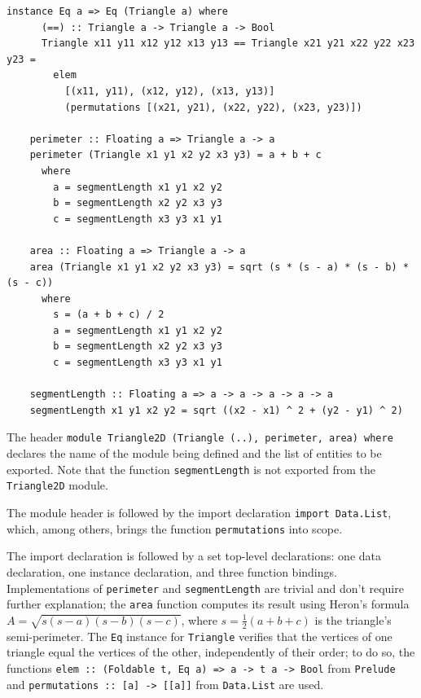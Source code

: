 \documentclass[UdineBachThesis,american,11pt]{PhdThesis}
\begin{document}
  \begin{Verbatim}[gobble=4,fontsize=\small]
    instance Eq a => Eq (Triangle a) where
      (==) :: Triangle a -> Triangle a -> Bool
      Triangle x11 y11 x12 y12 x13 y13 == Triangle x21 y21 x22 y22 x23 y23 =
        elem
          [(x11, y11), (x12, y12), (x13, y13)]
          (permutations [(x21, y21), (x22, y22), (x23, y23)])

    perimeter :: Floating a => Triangle a -> a
    perimeter (Triangle x1 y1 x2 y2 x3 y3) = a + b + c
      where
        a = segmentLength x1 y1 x2 y2
        b = segmentLength x2 y2 x3 y3
        c = segmentLength x3 y3 x1 y1

    area :: Floating a => Triangle a -> a
    area (Triangle x1 y1 x2 y2 x3 y3) = sqrt (s * (s - a) * (s - b) * (s - c))
      where
        s = (a + b + c) / 2
        a = segmentLength x1 y1 x2 y2
        b = segmentLength x2 y2 x3 y3
        c = segmentLength x3 y3 x1 y1

    segmentLength :: Floating a => a -> a -> a -> a -> a
    segmentLength x1 y1 x2 y2 = sqrt ((x2 - x1) ^ 2 + (y2 - y1) ^ 2)
  \end{Verbatim}

  The header
  \mbox{\texttt{module Triangle2D (Triangle (..), perimeter, area) where}}
  declares the name of the module being defined and the list of entities to be
  exported. Note that the function \mbox{\texttt{segmentLength}} is not exported
  from the \mbox{\texttt{Triangle2D}} module.

  The module header is followed by the import declaration
  \mbox{\texttt{import Data.List}}, which, among others, brings the function
  \mbox{\texttt{permutations}} into scope.

  The import declaration is followed by a set top-level declarations: one data
  declaration, one instance declaration, and three function bindings.
  Implementations of \mbox{\texttt{perimeter}} and \mbox{\texttt{segmentLength}}
  are trivial and don't require further explanation; the \mbox{\texttt{area}}
  function computes its result using Heron's formula
  \mbox{$A = \sqrt{s \left(s - a\right) \left(s - b\right) \left(s - c\right)}$},
  where \mbox{$s = \frac{1}{2} \left(a + b + c\right)$} is the triangle's
  semi-perimeter. The \mbox{\texttt{Eq}} instance for \mbox{\texttt{Triangle}}
  verifies that the vertices of one triangle equal the vertices of the other,
  independently of their order; to do so, the functions
  \mbox{\texttt{elem :: (Foldable t, Eq a) => a -> t a -> Bool}} from
  \mbox{\texttt{Prelude}} and \mbox{\texttt{permutations :: [a] -> [[a]]}} from
  \mbox{\texttt{Data.List}} are used.
\end{document}

